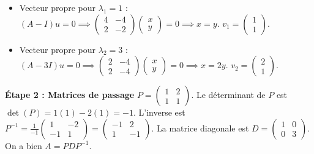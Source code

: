 \documentclass[11pt,a4paper]{article}
\begin{document}
\begin{itemize}
\item Vecteur propre pour $\lambda_1 = 1$ : $(A - I)u = 0 \implies \begin{pmatrix} 4 & -4 \\ 2 & -2 \end{pmatrix} \begin{pmatrix} x \\ y \end{pmatrix} = 0 \implies x = y$. $v_1 = \begin{pmatrix} 1 \\ 1 \end{pmatrix}$.
\item Vecteur propre pour $\lambda_2 = 3$ : $(A - 3I)u = 0 \implies \begin{pmatrix} 2 & -4 \\ 2 & -4 \end{pmatrix} \begin{pmatrix} x \\ y \end{pmatrix} = 0 \implies x = 2y$. $v_2 = \begin{pmatrix} 2 \\ 1 \end{pmatrix}$.
\end{itemize}
\textbf{Étape 2 : Matrices de passage}
$P = \begin{pmatrix} 1 & 2 \\ 1 & 1 \end{pmatrix}$.
Le déterminant de $P$ est $\det(P) = 1(1) - 2(1) = -1$.
L'inverse est $P^{-1} = \frac{1}{-1} \begin{pmatrix} 1 & -2 \\ -1 & 1 \end{pmatrix} = \begin{pmatrix} -1 & 2 \\ 1 & -1 \end{pmatrix}$.
La matrice diagonale est $D = \begin{pmatrix} 1 & 0 \\ 0 & 3 \end{pmatrix}$.
On a bien $A = P D P^{-1}$.
\end{document}
